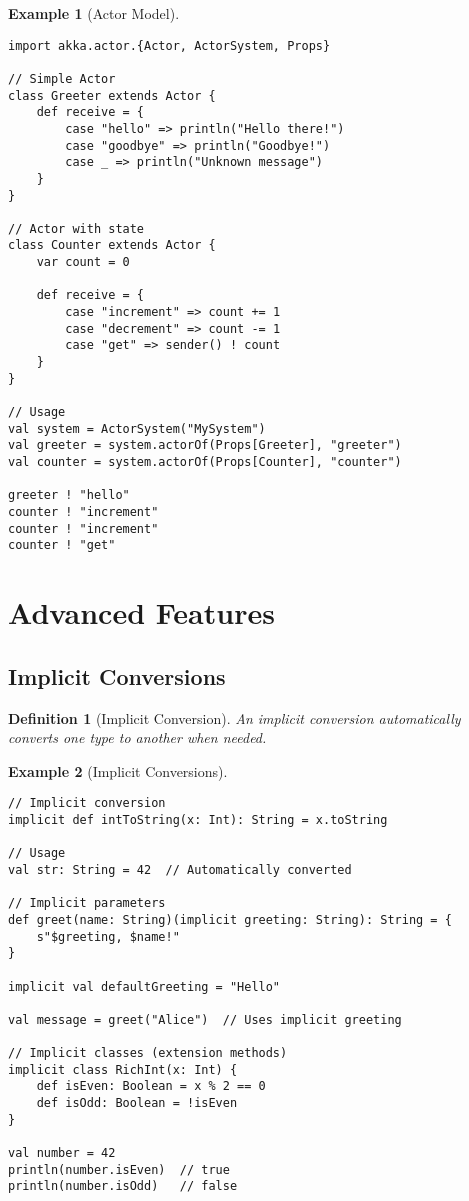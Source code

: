 \documentclass[11pt]{article}
\newtheorem{definition}{Definition}[section]
\newtheorem{example}{Example}[section]
\begin{document}
\begin{example}[Actor Model]
\begin{lstlisting}
import akka.actor.{Actor, ActorSystem, Props}

// Simple Actor
class Greeter extends Actor {
    def receive = {
        case "hello" => println("Hello there!")
        case "goodbye" => println("Goodbye!")
        case _ => println("Unknown message")
    }
}

// Actor with state
class Counter extends Actor {
    var count = 0
    
    def receive = {
        case "increment" => count += 1
        case "decrement" => count -= 1
        case "get" => sender() ! count
    }
}

// Usage
val system = ActorSystem("MySystem")
val greeter = system.actorOf(Props[Greeter], "greeter")
val counter = system.actorOf(Props[Counter], "counter")

greeter ! "hello"
counter ! "increment"
counter ! "increment"
counter ! "get"
\end{lstlisting}
\end{example}

\section{Advanced Features}

\subsection{Implicit Conversions}

\begin{definition}[Implicit Conversion]
An implicit conversion automatically converts one type to another when needed.
\end{definition}

\begin{example}[Implicit Conversions]
\begin{lstlisting}
// Implicit conversion
implicit def intToString(x: Int): String = x.toString

// Usage
val str: String = 42  // Automatically converted

// Implicit parameters
def greet(name: String)(implicit greeting: String): String = {
    s"$greeting, $name!"
}

implicit val defaultGreeting = "Hello"

val message = greet("Alice")  // Uses implicit greeting

// Implicit classes (extension methods)
implicit class RichInt(x: Int) {
    def isEven: Boolean = x % 2 == 0
    def isOdd: Boolean = !isEven
}

val number = 42
println(number.isEven)  // true
println(number.isOdd)   // false
\end{lstlisting}
\end{example}
\end{document}
